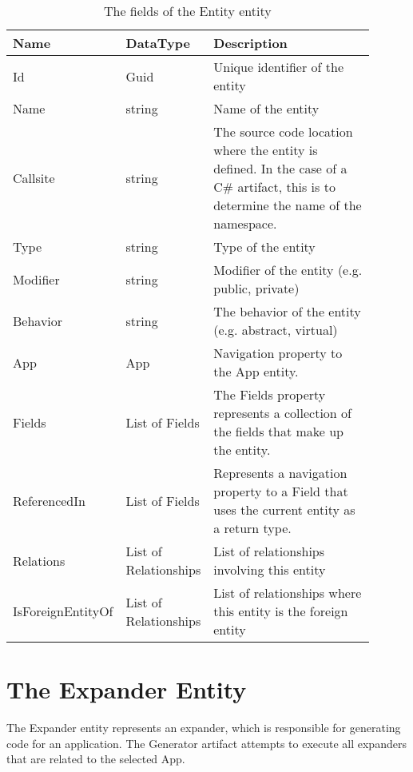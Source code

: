 \begin{table}[H]
\small
\begin{tabular}{ p{0.20\linewidth} p{0.23\linewidth} p{0.47\linewidth} }
\hline
\textbf{Name} & \textbf{DataType} & \textbf{Description} \\
\hline
Id & Guid & Unique identifier of the entity \\
Name & string & Name of the entity \\
Callsite & string & The source code location where the entity is defined. In the case of a C\#
artifact, this is to determine the name of the namespace.\\
Type & string & Type of the entity \\
Modifier & string & Modifier of the entity (e.g. public, private) \\
Behavior & string & The behavior of the entity (e.g. abstract, virtual) \\
App & App & Navigation property to the App entity. \\
Fields & List of Fields & The Fields property represents a collection of the fields that
make up the entity. \\
ReferencedIn & List of Fields & Represents a navigation property to a Field that uses the
current entity as a return type. \\
Relations & List of Relationships & List of relationships involving this entity \\
IsForeignEntityOf & List of Relationships & List of relationships where this entity is the foreign entity \\
\hline
\end{tabular}
\caption{The fields of the Entity entity}
\label{table:entity_entity}
\end{table}

\section{The Expander Entity}

The Expander entity represents an expander, which is responsible for generating code for
an application. The Generator artifact attempts to execute all expanders that are related
to the selected App.

